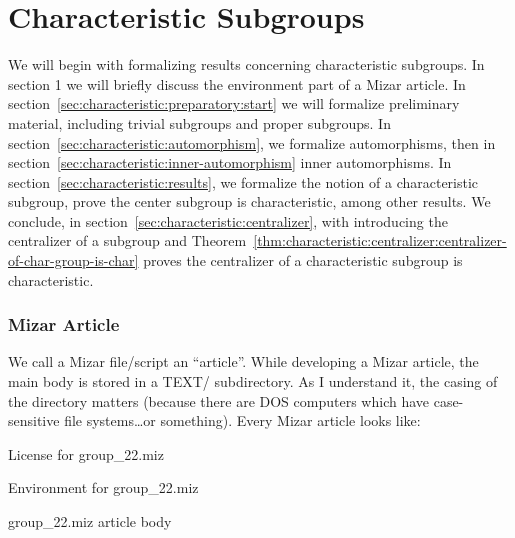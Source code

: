 \chapter{Characteristic Subgroups}

We will begin with formalizing results concerning characteristic
subgroups. In section 1 we will briefly discuss the environment part of
a Mizar article. In section~\ref{sec:characteristic:preparatory:start} we will formalize preliminary material,
including trivial subgroups and proper subgroups. In
section~\ref{sec:characteristic:automorphism}, we formalize
automorphisms, then in
section~\ref{sec:characteristic:inner-automorphism} inner automorphisms.
In section~\ref{sec:characteristic:results}, we formalize the notion of
a characteristic subgroup, prove the center subgroup is characteristic,
among other results. We conclude, in section~\ref{sec:characteristic:centralizer},
with introducing the centralizer of a subgroup and Theorem~\ref{thm:characteristic:centralizer:centralizer-of-char-group-is-char} proves the
centralizer of a characteristic subgroup is characteristic.

\subsection*{Mizar Article}
We call a Mizar file/script an ``article''. While developing a Mizar
article, the main body is stored in a {\Tt{}TEXT/\nwendquote} subdirectory. As I
understand it, the casing of the directory matters (because there are
DOS computers which have case-sensitive file systems\dots or something).
Every Mizar article looks like:

\nwenddocs{}\endmoddef\nwstartdeflinemarkup\nwenddeflinemarkup
\LA{}License for \code{}group{\_}22.miz\edoc{}~{\nwtagstyle{}}\RA{}

\LA{}Environment for \code{}group{\_}22.miz\edoc{}~{\nwtagstyle{}}\RA{}

\LA{}\code{}group{\_}22.miz\edoc{} article body~{\nwtagstyle{}}\RA{}
\nwendcode{}\nwdocspar

